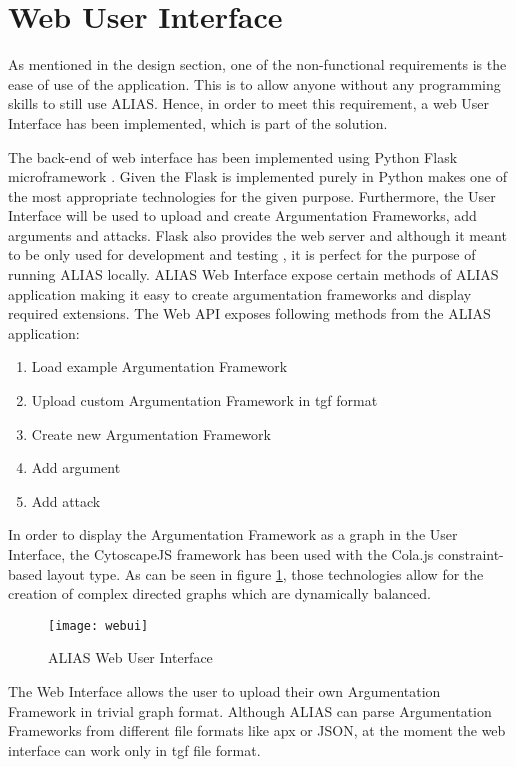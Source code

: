 \section{Web User Interface}
As mentioned in the design section, one of the non-functional requirements is the ease of use of the application. This is to allow anyone without any programming skills to still use ALIAS. Hence, in order to meet this requirement, a web User Interface has been implemented, which is part of the solution.

The back-end of web interface has been implemented using Python Flask microframework \citep{flaskDocs}. Given the Flask is implemented purely in Python makes one of the most appropriate technologies for the given purpose. Furthermore, the User Interface will be used to upload and create Argumentation Frameworks, add arguments and attacks. Flask also provides the web server and although it meant to be only used for development and testing \citep{flaskBook}, it is perfect for the purpose of running ALIAS locally. ALIAS Web Interface expose certain methods of ALIAS application making it easy to create argumentation frameworks and display required extensions. The Web API exposes following methods from the ALIAS application:
\begin{enumerate}
	\item Load example Argumentation Framework
	\item Upload custom Argumentation Framework in tgf format
	\item Create new Argumentation Framework
	\item Add argument
	\item Add attack
\end{enumerate}

In order to display the Argumentation Framework as a graph in the User Interface, the CytoscapeJS \citep{cytoscapejs} framework has been used with the Cola.js constraint-based layout type. As can be seen in figure \ref{fig:webUi}, those technologies allow for the creation of complex directed graphs which are dynamically balanced.

\begin{figure}[h]
	\texttt{[image: webui]}
	\caption{ALIAS Web User Interface}
	\label{fig:webUi}
\end{figure}

The Web Interface allows the user to upload their own Argumentation Framework in trivial graph format. Although ALIAS can parse Argumentation Frameworks from different file formats like apx or JSON, at the moment the web interface can work only in tgf file format. 

